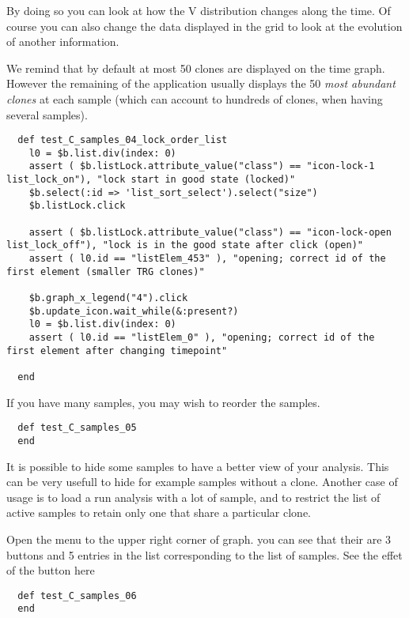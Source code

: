 By doing so you can look at how the V distribution changes along the time.
Of course you can also change the data displayed in the grid to look at
the evolution of another information.

\bigskip

We remind that by default at most 50 clones are displayed
on the time graph. However the remaining of the application usually displays
the 50 \textit{most abundant clones} at each sample (which can account to hundreds of
clones, when having several samples).

\begin{verbatim}
  def test_C_samples_04_lock_order_list
    l0 = $b.list.div(index: 0)
    assert ( $b.listLock.attribute_value("class") == "icon-lock-1 list_lock_on"), "lock start in good state (locked)"
    $b.select(:id => 'list_sort_select').select("size")
    $b.listLock.click

    assert ( $b.listLock.attribute_value("class") == "icon-lock-open list_lock_off"), "lock is in the good state after click (open)"
    assert ( l0.id == "listElem_453" ), "opening; correct id of the first element (smaller TRG clones)"

    $b.graph_x_legend("4").click
    $b.update_icon.wait_while(&:present?)
    l0 = $b.list.div(index: 0)
    assert ( l0.id == "listElem_0" ), "opening; correct id of the first element after changing timepoint"

  end
\end{verbatim}

\bigskip

If you have many samples, you may wish to reorder the samples.

\begin{verbatim}
  def test_C_samples_05
  end
\end{verbatim}

It is possible to hide some samples to have a better view of your analysis. This can be very usefull to hide for example samples without a clone.
Another case of usage is to load a run analysis with a lot of sample, and to restrict the list of active samples to retain only one that share a particular clone.

Open the menu to the upper right corner of graph. you can see that their are 3 buttons and 5 entries in the list corresponding to the list of samples.
See the effet of the button here
\begin{verbatim}
  def test_C_samples_06
  end
\end{verbatim}

